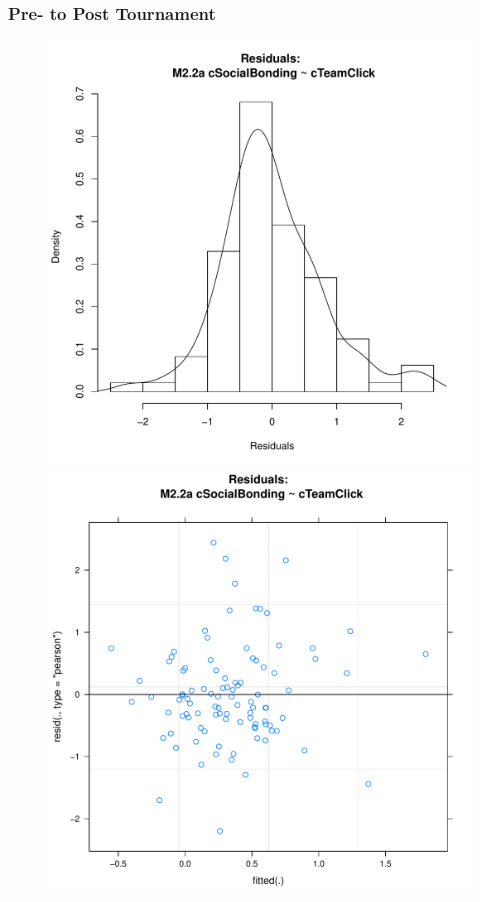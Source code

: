       \subsubsection{Pre- to Post Tournament}


      


      \begin{figure}[htbp]
        \includegraphics[scale =.4]{images/MLM22aHist.pdf}
        \includegraphics[scale =.4]{images/MLM22aScatter.pdf}

\end{figure}
